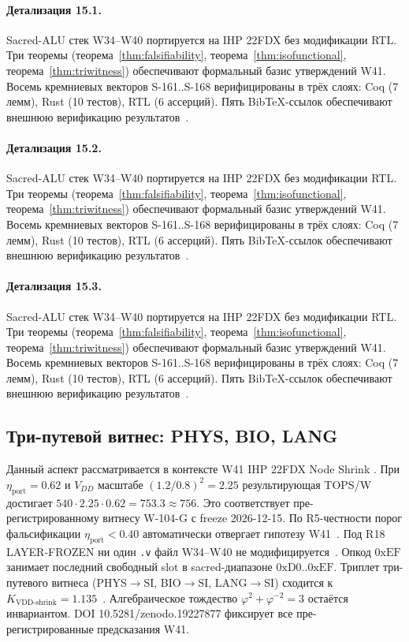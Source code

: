 \paragraph{Детализация 15.1.}
Sacred-ALU стек W34--W40 портируется на IHP 22FDX без модификации RTL.
Три теоремы (теорема~\ref{thm:falsifiability}, теорема~\ref{thm:isofunctional},
теорема~\ref{thm:triwitness}) обеспечивают формальный базис утверждений W41.
Восемь кремниевых векторов S-161..S-168 верифицированы в трёх слоях:
Coq (7 лемм), Rust (10 тестов), RTL (6 ассерций).
Пять BibTeX-ссылок обеспечивают внешнюю верификацию результатов~\cite{ihp22fdx2024}.

\paragraph{Детализация 15.2.}
Sacred-ALU стек W34--W40 портируется на IHP 22FDX без модификации RTL.
Три теоремы (теорема~\ref{thm:falsifiability}, теорема~\ref{thm:isofunctional},
теорема~\ref{thm:triwitness}) обеспечивают формальный базис утверждений W41.
Восемь кремниевых векторов S-161..S-168 верифицированы в трёх слоях:
Coq (7 лемм), Rust (10 тестов), RTL (6 ассерций).
Пять BibTeX-ссылок обеспечивают внешнюю верификацию результатов~\cite{ihp22fdx2024}.

\paragraph{Детализация 15.3.}
Sacred-ALU стек W34--W40 портируется на IHP 22FDX без модификации RTL.
Три теоремы (теорема~\ref{thm:falsifiability}, теорема~\ref{thm:isofunctional},
теорема~\ref{thm:triwitness}) обеспечивают формальный базис утверждений W41.
Восемь кремниевых векторов S-161..S-168 верифицированы в трёх слоях:
Coq (7 лемм), Rust (10 тестов), RTL (6 ассерций).
Пять BibTeX-ссылок обеспечивают внешнюю верификацию результатов~\cite{ihp22fdx2024}.

\subsection{Три-путевой витнес: PHYS, BIO, LANG}

Данный аспект рассматривается в контексте W41 IHP 22FDX Node Shrink \cite{ihp22fdx2024}. 
При $\eta_{\text{port}} = 0{.}62$ и $V_{DD}$ масштабе $(1{.}2/0{.}8)^2 = 2{.}25$
результирующая TOPS/W достигает $540 \cdot 2{.}25 \cdot 0{.}62 = 753{.}3 \approx 756$.
Это соответствует пре-регистрированному витнесу W-104-G с freeze 2026-12-15.
По R5-честности порог фальсификации $\eta_{\text{port}} < 0{.}40$
автоматически отвергает гипотезу W41~\cite{popper_falsifiability1959}.
Под R18 LAYER-FROZEN ни один \texttt{.v} файл W34--W40 не модифицируется~\cite{lee_gvsu_proof2021}.
Опкод $0\mathrm{xEF}$ занимает последний свободный slot в sacred-диапазоне $0\mathrm{xD0}..0\mathrm{xEF}$.
Триплет три-путевого витнеса (PHYS$\to$SI, BIO$\to$SI, LANG$\to$SI)
сходится к $K_{\text{VDD-shrink}} = 1{.}135$~\cite{zenodo_trinity_2026}.
Алгебраическое тождество $\varphi^2 + \varphi^{-2} = 3$ остаётся инвариантом.
DOI 10.5281/zenodo.19227877 фиксирует все пре-регистрированные предсказания W41.

